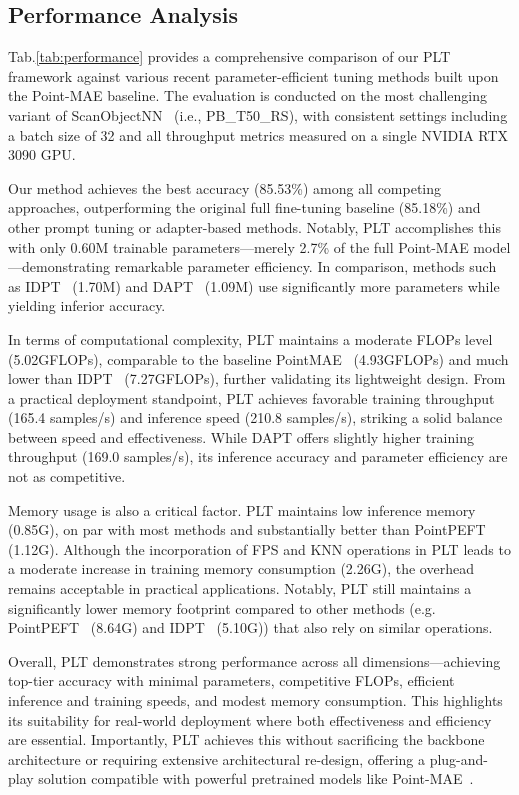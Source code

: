 \subsection{Performance Analysis}

Tab.\ref{tab:performance} provides a comprehensive comparison of our PLT framework against various recent parameter-efficient tuning methods built upon the Point-MAE\cite{pang2022masked} baseline. The evaluation is conducted on the most challenging variant of ScanObjectNN~\cite{uy2019revisiting} (i.e., PB\_T50\_RS), with consistent settings including a batch size of 32 and all throughput metrics measured on a single NVIDIA RTX 3090 GPU.

Our method achieves the best accuracy (85.53\%) among all competing approaches, outperforming the original full fine-tuning baseline (85.18\%) and other prompt tuning or adapter-based methods. Notably, PLT accomplishes this with only 0.60M trainable parameters—merely 2.7\% of the full Point-MAE model—demonstrating remarkable parameter efficiency. In comparison, methods such as IDPT~\cite{zha2023instance} (1.70M) and DAPT~\cite{zhou2024dynamic} (1.09M) use significantly more parameters while yielding inferior accuracy.

In terms of computational complexity, PLT maintains a moderate FLOPs level (5.02GFLOPs), comparable to the baseline PointMAE~\cite{pang2022masked} (4.93GFLOPs) and much lower than IDPT~\cite{zha2023instance} (7.27GFLOPs), further validating its lightweight design. From a practical deployment standpoint, PLT achieves favorable training throughput (165.4 samples/s) and inference speed (210.8 samples/s), striking a solid balance between speed and effectiveness. While DAPT offers slightly higher training throughput (169.0 samples/s), its inference accuracy and parameter efficiency are not as competitive.

Memory usage is also a critical factor. PLT maintains low inference memory (0.85G), on par with most methods and substantially better than PointPEFT~\cite{tang2024point} (1.12G). Although the incorporation of FPS and KNN operations in PLT leads to a moderate increase in training memory consumption (2.26G), the overhead remains acceptable in practical applications. Notably, PLT still maintains a significantly lower memory footprint compared to other methods (e.g. PointPEFT~\cite{tang2024point} (8.64G) and IDPT~\cite{zha2023instance} (5.10G)) that also rely on similar operations.

Overall, PLT demonstrates strong performance across all dimensions—achieving top-tier accuracy with minimal parameters, competitive FLOPs, efficient inference and training speeds, and modest memory consumption. This highlights its suitability for real-world deployment where both effectiveness and efficiency are essential. Importantly, PLT achieves this without sacrificing the backbone architecture or requiring extensive architectural re-design, offering a plug-and-play solution compatible with powerful pretrained models like Point-MAE~\cite{pang2022masked}.